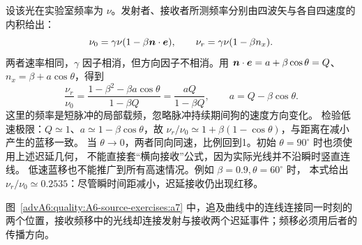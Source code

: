 \begin{advsolution}
设该光在实验室频率为 $\nu$。发射者、接收者所测频率分别由四波矢与各自四速度的内积给出：
\[
 \nu_0=\gamma\nu(1-\beta\bm{n}\cdot\bm{e}),\qquad
 \nu_r=\gamma\nu(1-\beta n_x).
\]
两者速率相同，$\gamma$ 因子相消，但方向因子不相消。用
$\bm{n}\cdot\bm{e}=a+\beta\cos\theta=Q$、$n_x=\beta+a\cos\theta$，得到
\[
 \boxed{\frac{\nu_r}{\nu_0}
 =\frac{1-\beta^2-\beta a\cos\theta}{1-\beta Q}
 =\frac{aQ}{1-\beta Q}},\qquad a=Q-\beta\cos\theta.
\]
这里的频率是短脉冲的局部载频，忽略脉冲持续期间狗的速度方向变化。
检验低速极限：$Q\simeq1$、$a\simeq1-\beta\cos\theta$，故
$\nu_r/\nu_0\simeq1+\beta(1-\cos\theta)$，与距离在减小产生的蓝移一致。
当 $\theta\to0$，两者同向同速，比例回到1。初始 $\theta=90^\circ$ 时也须使用上述迟延几何，
不能直接套“横向接收”公式，因为实际光线并不沿瞬时竖直连线。
低速蓝移也不能推广到所有高速情况。例如 $\beta=0.9,\theta=60^\circ$ 时，
本式给出 $\nu_r/\nu_0\simeq0.2535$：尽管瞬时间距减小，迟延接收仍出现红移。

图~\ref{advA6:quality:A6-source-exercises:a7} 中，追及曲线中的连线连接同一时刻的两个位置，接收频移中的光线却连接发射与接收两个迟延事件；频移必须用后者的传播方向。
\end{advsolution}
\endgroup
